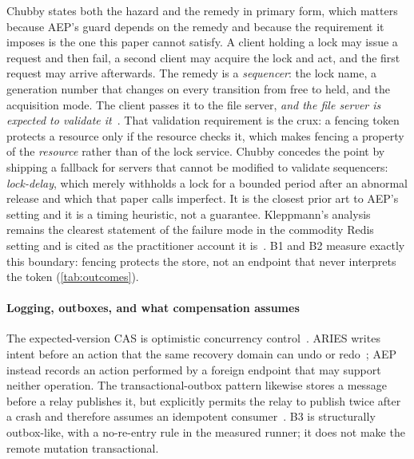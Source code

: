 Chubby states both the hazard and the remedy in primary form, which matters
because AEP's guard depends on the remedy and because the requirement it imposes
is the one this paper cannot satisfy. A client holding a lock may issue a request
and then fail, a second client may acquire the lock and act, and the first
request may arrive afterwards. The remedy is a \emph{sequencer}: the lock
name, a generation number that changes on every transition from free to held,
and the acquisition mode. The client passes it to the file server,
\emph{and the file server is expected to validate it}~\cite{burrows2006chubby}.
That validation requirement is the crux: a fencing token protects a resource only
if the resource checks it, which makes fencing a property of the \emph{resource}
rather than of the lock service. Chubby concedes the point by shipping a fallback
for servers that cannot be modified to validate sequencers: \emph{lock-delay},
which merely withholds a lock for a bounded period after an abnormal release and
which that paper calls imperfect. It is the closest prior art to AEP's setting
and it is a timing heuristic, not a guarantee. Kleppmann's analysis remains the
clearest statement of the failure mode in the commodity Redis setting and is
cited as the practitioner account it is~\cite{kleppmann2016locking}. B1 and B2
measure exactly this boundary: fencing protects the store, not an endpoint that
never interprets the token (\cref{tab:outcomes}).

\paragraph{Logging, outboxes, and what compensation assumes} The
expected-version CAS is optimistic concurrency control~\cite{kung1981optimistic}.
ARIES writes intent before an action that the same recovery domain can undo or
redo~\cite{mohan1992aries}; AEP instead records an action performed by a foreign
endpoint that may support neither operation. The transactional-outbox pattern
likewise stores a message before a relay publishes it, but explicitly permits the
relay to publish twice after a crash and therefore assumes an idempotent
consumer~\cite{richardson-transactional-outbox}. B3 is structurally outbox-like,
with a no-re-entry rule in the measured runner; it does not make the remote
mutation transactional.

